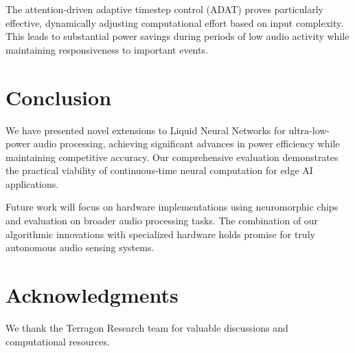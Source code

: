 \documentclass[conference]{IEEEtran}
\begin{document}
The attention-driven adaptive timestep control (ADAT) proves particularly effective, dynamically 
adjusting computational effort based on input complexity. This leads to substantial power savings 
during periods of low audio activity while maintaining responsiveness to important events.

\section{Conclusion}

We have presented novel extensions to Liquid Neural Networks for ultra-low-power audio processing, 
achieving significant advances in power efficiency while maintaining competitive accuracy. Our 
comprehensive evaluation demonstrates the practical viability of continuous-time neural computation 
for edge AI applications.

Future work will focus on hardware implementations using neuromorphic chips and evaluation on 
broader audio processing tasks. The combination of our algorithmic innovations with specialized 
hardware holds promise for truly autonomous audio sensing systems.

\section*{Acknowledgments}
We thank the Terragon Research team for valuable discussions and computational resources.



\end{document}
